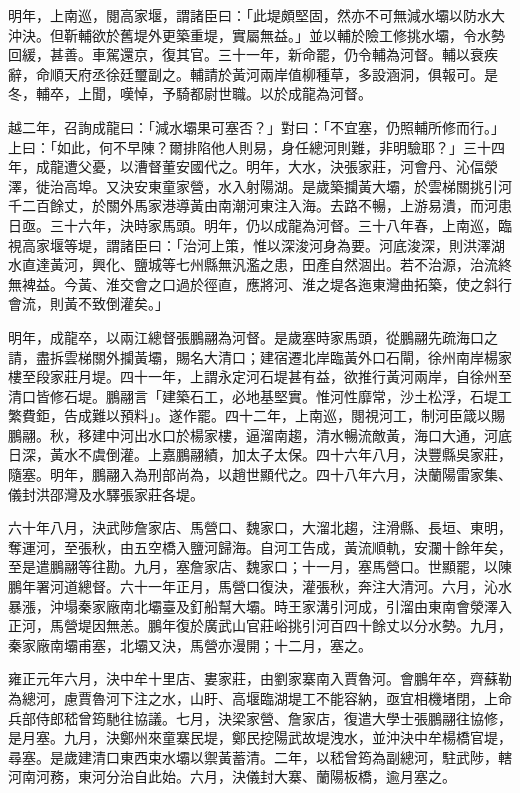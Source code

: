 \begin{pinyinscope}
明年，上南巡，閱高家堰，謂諸臣曰：「此堤頗堅固，然亦不可無減水壩以防水大沖決。但靳輔欲於舊堤外更築重堤，實屬無益。」並以輔於險工修挑水壩，令水勢回緩，甚善。車駕還京，復其官。三十一年，新命罷，仍令輔為河督。輔以衰疾辭，命順天府丞徐廷璽副之。輔請於黃河兩岸值柳種草，多設涵洞，俱報可。是冬，輔卒，上聞，嘆悼，予騎都尉世職。以於成龍為河督。

越二年，召詢成龍曰：「減水壩果可塞否？」對曰：「不宜塞，仍照輔所修而行。」上曰：「如此，何不早陳？爾排陷他人則易，身任總河則難，非明驗耶？」三十四年，成龍遭父憂，以漕督董安國代之。明年，大水，決張家莊，河會丹、沁偪滎澤，徙治高埠。又決安東童家營，水入射陽湖。是歲築攔黃大壩，於雲梯關挑引河千二百餘丈，於關外馬家港導黃由南潮河東注入海。去路不暢，上游易潰，而河患日亟。三十六年，決時家馬頭。明年，仍以成龍為河督。三十八年春，上南巡，臨視高家堰等堤，謂諸臣曰：「治河上策，惟以深浚河身為要。河底浚深，則洪澤湖水直達黃河，興化、鹽城等七州縣無汎濫之患，田產自然涸出。若不治源，治流終無裨益。今黃、淮交會之口過於徑直，應將河、淮之堤各迤東灣曲拓築，使之斜行會流，則黃不致倒灌矣。」

明年，成龍卒，以兩江總督張鵬翮為河督。是歲塞時家馬頭，從鵬翮先疏海口之請，盡拆雲梯關外攔黃壩，賜名大清口；建宿遷北岸臨黃外口石閘，徐州南岸楊家樓至段家莊月堤。四十一年，上謂永定河石堤甚有益，欲推行黃河兩岸，自徐州至清口皆修石堤。鵬翮言「建築石工，必地基堅實。惟河性靡常，沙土松浮，石堤工繁費鉅，告成難以預料」。遂作罷。四十二年，上南巡，閱視河工，制河臣箴以賜鵬翮。秋，移建中河出水口於楊家樓，逼溜南趨，清水暢流敵黃，海口大通，河底日深，黃水不虞倒灌。上嘉鵬翮績，加太子太保。四十六年八月，決豐縣吳家莊，隨塞。明年，鵬翮入為刑部尚為，以趙世顯代之。四十八年六月，決蘭陽雷家集、儀封洪邵灣及水驛張家莊各堤。

六十年八月，決武陟詹家店、馬營口、魏家口，大溜北趨，注滑縣、長垣、東明，奪運河，至張秋，由五空橋入鹽河歸海。自河工告成，黃流順軌，安瀾十餘年矣，至是遣鵬翮等往勘。九月，塞詹家店、魏家口；十一月，塞馬營口。世顯罷，以陳鵬年署河道總督。六十一年正月，馬營口復決，灌張秋，奔注大清河。六月，沁水暴漲，沖塌秦家廠南北壩臺及釘船幫大壩。時王家溝引河成，引溜由東南會滎澤入正河，馬營堤因無恙。鵬年復於廣武山官莊峪挑引河百四十餘丈以分水勢。九月，秦家廠南壩甫塞，北壩又決，馬營亦漫開；十二月，塞之。

雍正元年六月，決中牟十里店、婁家莊，由劉家寨南入賈魯河。會鵬年卒，齊蘇勒為總河，慮賈魯河下注之水，山盱、高堰臨湖堤工不能容納，亟宜相機堵閉，上命兵部侍郎嵇曾筠馳往協議。七月，決梁家營、詹家店，復遣大學士張鵬翮往協修，是月塞。九月，決鄭州來童寨民堤，鄭民挖陽武故堤洩水，並沖決中牟楊橋官堤，尋塞。是歲建清口東西束水壩以禦黃蓄清。二年，以嵇曾筠為副總河，駐武陟，轄河南河務，東河分治自此始。六月，決儀封大寨、蘭陽板橋，逾月塞之。


\end{pinyinscope}
